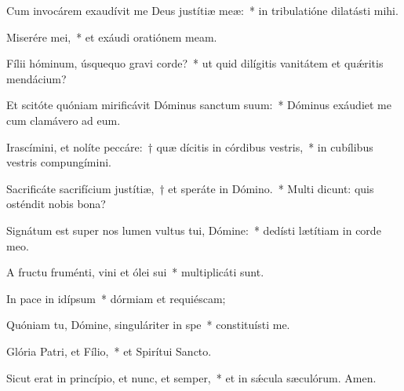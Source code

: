 \item Cum invocárem exaudívit me Deus justítiæ meæ:~* in tribulatióne dilatásti mihi.

\item Miserére mei,~* et exáudi oratiónem meam.

\item Fílii hóminum, úsquequo gravi corde?~* ut quid dilígitis vanitátem et quǽritis mendácium?

\item Et scitóte quóniam mirificávit Dóminus sanctum suum:~* Dóminus exáudiet me cum clamávero ad eum.

\item Irascímini, et nolíte peccáre:~† quæ dícitis in córdibus vestris,~* in cubílibus vestris compungímini.

\item Sacrificáte sacrifícium justítiæ,~† et speráte in Dómino.~* Multi dicunt: quis osténdit nobis bona?

\item Signátum est super nos lumen vultus tui, Dómine:~* dedísti lætítiam in corde meo.

\item A fructu fruménti, vini et ólei sui~* multiplicáti sunt.

\item In pace in idípsum~* dórmiam et requiéscam;

\item Quóniam tu, Dómine, singuláriter in spe~* constituísti me.

\item Glória Patri, et Fílio,~* et Spirítui Sancto.

\item Sicut erat in princípio, et nunc, et semper,~* et in sǽcula sæculórum. Amen.

